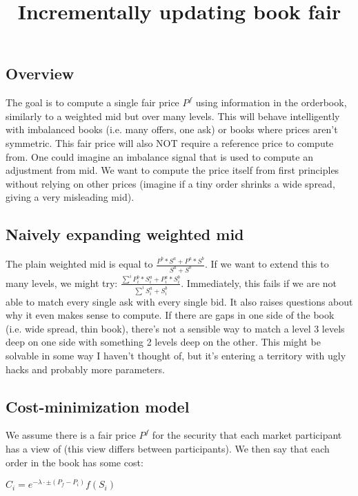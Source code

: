 \documentclass[]{article}
\title{Incrementally updating book fair}
\author{}
\begin{document}
\maketitle

\subsection{Overview}

The goal is to compute a single fair price $P^f$ using information in the orderbook, similarly to a weighted mid but over many levels. This will behave intelligently with imbalanced books (i.e. many offers, one ask) or books where prices aren't symmetric. This fair price will also NOT require a reference price to compute from. One could imagine an imbalance signal that is used to compute an adjustment from mid. We want to compute the price itself from first principles without relying on other prices (imagine if a tiny order shrinks a wide spread, giving a very misleading mid).


\subsection{Naively expanding weighted mid}

The plain weighted mid is equal to $\frac{P^b * S^a + P^a * S^b}{S^a + S^b}$. If we want to extend this to many levels, we might try: $\frac{\sum^i P^b_i * S^a_i + P^a_i * S^b_i}{\sum^i S^a_i + S^b_i}$. Immediately, this fails if we are not able to match every single ask with every single bid.
It also raises questions about why it even makes sense to compute. If there are gaps in one side of the book (i.e. wide spread, thin book), there's not a sensible way to match a level 3 levels deep on one side with something 2 levels deep on the other. This might be solvable in some way I haven't thought of, but it's entering a territory with ugly hacks and probably more parameters.

\subsection{Cost-minimization model}

We assume there is a fair price $P^f$ for the security that each market participant has a view of (this view differs between participants). We then say that each order in the book has some cost:

\begin{math}
	C_i = e^{-\lambda \cdot \pm (P_f - P_i )} f(S_i)
\end{math}
\end{document}
